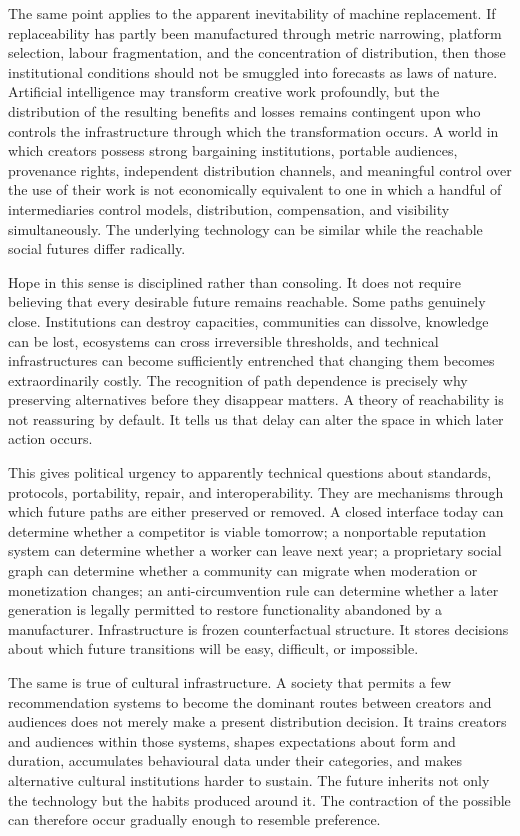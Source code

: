 \documentclass[11pt]{article}
\begin{document}
The same point applies to the apparent inevitability of machine replacement. If replaceability has partly been manufactured through metric narrowing, platform selection, labour fragmentation, and the concentration of distribution, then those institutional conditions should not be smuggled into forecasts as laws of nature. Artificial intelligence may transform creative work profoundly, but the distribution of the resulting benefits and losses remains contingent upon who controls the infrastructure through which the transformation occurs. A world in which creators possess strong bargaining institutions, portable audiences, provenance rights, independent distribution channels, and meaningful control over the use of their work is not economically equivalent to one in which a handful of intermediaries control models, distribution, compensation, and visibility simultaneously. The underlying technology can be similar while the reachable social futures differ radically.

Hope in this sense is disciplined rather than consoling. It does not require believing that every desirable future remains reachable. Some paths genuinely close. Institutions can destroy capacities, communities can dissolve, knowledge can be lost, ecosystems can cross irreversible thresholds, and technical infrastructures can become sufficiently entrenched that changing them becomes extraordinarily costly. The recognition of path dependence is precisely why preserving alternatives before they disappear matters. A theory of reachability is not reassuring by default. It tells us that delay can alter the space in which later action occurs.

This gives political urgency to apparently technical questions about standards, protocols, portability, repair, and interoperability. They are mechanisms through which future paths are either preserved or removed. A closed interface today can determine whether a competitor is viable tomorrow; a nonportable reputation system can determine whether a worker can leave next year; a proprietary social graph can determine whether a community can migrate when moderation or monetization changes; an anti-circumvention rule can determine whether a later generation is legally permitted to restore functionality abandoned by a manufacturer. Infrastructure is frozen counterfactual structure. It stores decisions about which future transitions will be easy, difficult, or impossible.

The same is true of cultural infrastructure. A society that permits a few recommendation systems to become the dominant routes between creators and audiences does not merely make a present distribution decision. It trains creators and audiences within those systems, shapes expectations about form and duration, accumulates behavioural data under their categories, and makes alternative cultural institutions harder to sustain. The future inherits not only the technology but the habits produced around it. The contraction of the possible can therefore occur gradually enough to resemble preference.
\end{document}
